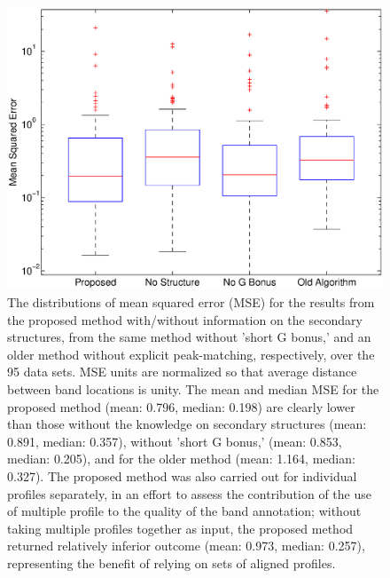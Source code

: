 \documentclass[letter]{bioinfo}
\begin{document}
\begin{figure}
\centering
\includegraphics[width=\linewidth]{figures/supp_old_new_comparison3}
\caption{The distributions of mean squared error (MSE) for the results from the proposed method with/without information on the secondary structures, from the same method without 'short G bonus,' and an older method without explicit peak-matching, respectively, over the 95 data sets. MSE units are normalized so that average distance between band locations is unity. The mean and median MSE for the proposed method (mean: 0.796, median: 0.198) are clearly lower than those without the knowledge on secondary structures (mean: 0.891, median: 0.357), without 'short G bonus,' (mean: 0.853, median: 0.205), and for the older method (mean: 1.164, median: 0.327). The proposed method was also carried out for individual profiles separately, in an effort to assess the contribution of the use of multiple profile to the quality of the band annotation; without taking multiple profiles together as input, the proposed method returned relatively inferior outcome (mean: 0.973, median: 0.257), representing the benefit of relying on sets of aligned profiles.}
\label{f:old_vs_new}
\end{figure}
\end{document}
